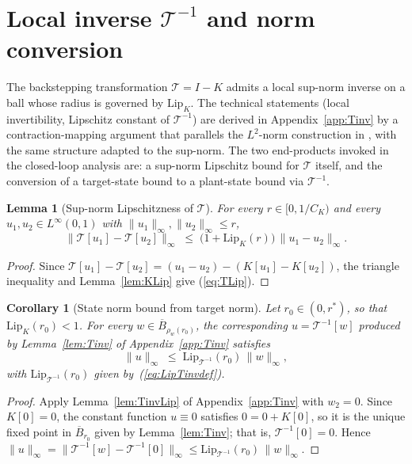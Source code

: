 \documentclass[10pt,a4paper]{amsart}
\newtheorem{lemma}{Lemma}
\newtheorem{corollary}{Corollary}
\newcommand{\Tcal}{\mathcal{T}}
\newcommand{\Linf}{L^\infty}
\newcommand{\Ltwo}{L^2}
\newcommand{\Lipk}{\mathrm{Lip}_K}
\newcommand{\LipT}{\mathrm{Lip}_{\Tcal^{-1}}}
\newcommand{\Bball}{\overline{B}}
\begin{document}
\section{Local inverse $\Tcal^{-1}$ and norm conversion}\label{sec:Tinv}

The backstepping transformation $\Tcal = I - K$ admits a local sup-norm inverse on a ball whose radius is governed by $\Lipk$. The technical statements (local invertibility, Lipschitz constant of $\Tcal^{-1}$) are derived in Appendix~\ref{app:Tinv} by a contraction-mapping argument that parallels the $\Ltwo$-norm construction in \cite{krstic2026feedbacklinearizationhyperbolicpdes}, with the same structure adapted to the sup-norm. The two end-products invoked in the closed-loop analysis are: a sup-norm Lipschitz bound for $\Tcal$ itself, and the conversion of a target-state bound to a plant-state bound via $\Tcal^{-1}$.

\begin{lemma}[Sup-norm Lipschitzness of $\Tcal$]\label{lem:TLip}
For every $r \in [0, 1/C_K)$ and every $u_1, u_2 \in \Linf(0,1)$ with $\|u_1\|_\infty, \|u_2\|_\infty \le r$,
\begin{equation}
\|\Tcal[u_1] - \Tcal[u_2]\|_\infty \;\le\; \bigl(1 + \Lipk(r)\bigr)\,\|u_1 - u_2\|_\infty.
\label{eq:TLip}
\end{equation}
\end{lemma}

\begin{proof}
Since $\Tcal[u_1] - \Tcal[u_2] = (u_1 - u_2) - (K[u_1] - K[u_2])$, the triangle inequality and Lemma~\ref{lem:KLip} give (\ref{eq:TLip}).
\end{proof}

\begin{corollary}[State norm bound from target norm]\label{cor:state_from_w}
Let $r_0 \in (0, r^*)$, so that $\Lipk(r_0) < 1$. For every $w \in \Bball_{\rho_w(r_0)}$, the corresponding $u = \Tcal^{-1}[w]$ produced by Lemma~\ref{lem:Tinv} of Appendix~\ref{app:Tinv} satisfies
\begin{equation}
\|u\|_\infty \;\le\; \LipT(r_0)\,\|w\|_\infty,
\label{eq:state_from_w}
\end{equation}
with $\LipT(r_0)$ given by~(\ref{eq:LipTinvdef}).
\end{corollary}

\begin{proof}
Apply Lemma~\ref{lem:TinvLip} of Appendix~\ref{app:Tinv} with $w_2 = 0$. Since $K[0] = 0$, the constant function $u \equiv 0$ satisfies $0 = 0 + K[0]$, so it is the unique fixed point in $\Bball_{r_0}$ given by Lemma~\ref{lem:Tinv}; that is, $\Tcal^{-1}[0] = 0$. Hence $\|u\|_\infty = \|\Tcal^{-1}[w] - \Tcal^{-1}[0]\|_\infty \le \LipT(r_0)\,\|w\|_\infty$.
\end{proof}
\end{document}
